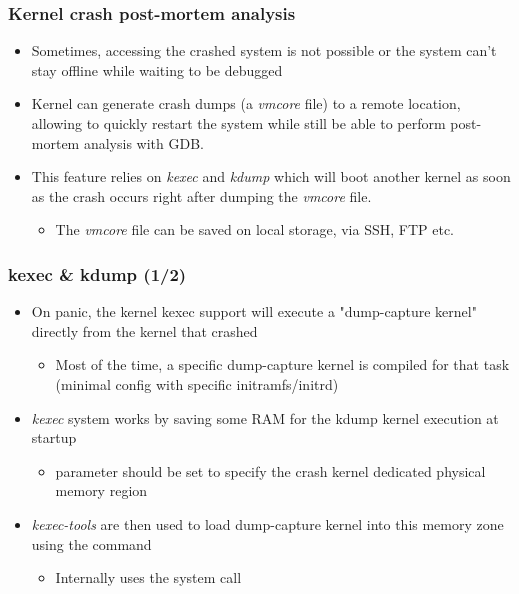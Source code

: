 \begin{frame}
  \frametitle{Kernel crash post-mortem analysis}
  \begin{itemize}
    \item Sometimes, accessing the crashed system is not possible or the system
          can't stay offline while waiting to be debugged
    \item Kernel can generate crash dumps (a {\em vmcore} file) to a remote
          location, allowing to quickly restart the system while still
          be able to perform post-mortem analysis with GDB.
    \item This feature relies on {\em kexec} and {\em kdump} which will
          boot another kernel as soon as the crash occurs right after dumping the
          {\em vmcore} file.
    \begin{itemize}
      \item The {\em vmcore} file can be saved on local storage, via SSH, FTP etc.
    \end{itemize}
  \end{itemize}
\end{frame}

\begin{frame}[fragile]
  \frametitle{kexec \& kdump (1/2)}
  \begin{itemize}
    \item On panic, the kernel kexec support will execute a "dump-capture
      kernel" directly from the kernel that crashed
    \begin{itemize}
      \item Most of the time, a specific dump-capture kernel is compiled
        for that task (minimal config with specific initramfs/initrd)
    \end{itemize}
    \item {\em kexec} system works by saving some RAM for the kdump kernel
      execution at startup
    \begin{itemize}
      \item {} parameter should be set to specify the crash
            kernel dedicated physical memory region
    \end{itemize}
    \item {\em kexec-tools} are then used to load dump-capture kernel into
      this memory zone using the  command
    \begin{itemize}
      \item Internally uses the  system call
    \end{itemize}
  \end{itemize}
\end{frame}

